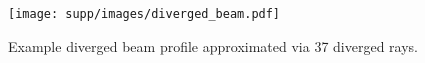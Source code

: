 \begin{figure}[t]
\centering
\texttt{[image: supp/images/diverged\_beam.pdf]}
\caption{Example diverged beam profile approximated via 37 diverged rays.}
\label{fig:iccv_diverged_ray}
\end{figure}